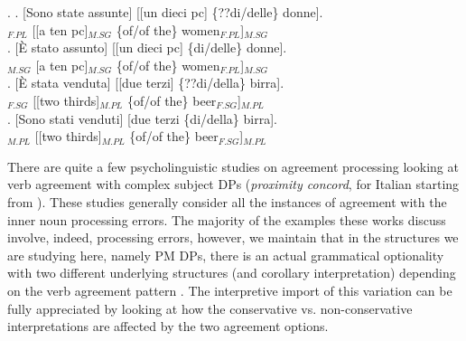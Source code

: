 \documentclass[charis, linguex]{glossa}
\begin{document}
\ex.  \ag. [Sono state assunte] [[un dieci pc] \{??di/delle\} donne]. \\
	       [are been hired]$_{F.PL}$ [[a ten pc]$_{M.SG}$ \{of/{of the}\} women$_{F.PL}$]$_{M.SG}$ \\ \label{relagreesub}
      \bg. [\`{E} stato assunto] [[un dieci pc] \{di/delle\} donne]. \\
 	       [is been hired]$_{M.SG}$ [a ten pc]$_{M.SG}$ \{of/{of the}\} women$_{F.PL}$]$_{M.SG}$ \\ \label{relagreeDP}
	 	\cg. [\`{E} stata venduta] [[due terzi] \{??di/della\} birra]. \\
	      [is been sold]$_{F.SG}$ [[two thirds]$_{M.PL}$ \{of/{of the}\} beer$_{F.SG}$]$_{M.PL}$ \\  \label{fracagreesub}
      \dg.  [Sono stati venduti] [due terzi \{di/della\} birra]. \\
           [are been sold]$_{M.PL}$ [[two thirds]$_{M.PL}$ \{of/{of the}\} beer$_{F.SG}$]$_{M.PL}$ \\ \label{fracagreeDP}

There are quite a few psycholinguistic studies on agreement processing looking at verb agreement with complex subject DPs  (\textit{proximity concord}, for Italian starting from \citealt{vig95}). These studies generally consider all the instances of agreement with the inner noun processing errors. The majority of the examples these works discuss involve, indeed, processing errors, however, we maintain that in the structures we are studying here, namely PM DPs, there is an actual grammatical optionality with two different underlying structures (and corollary interpretation) depending on the verb agreement pattern \citep[\S1]{man19}. The interpretive import of this variation can be fully appreciated by looking at how the conservative vs. non-conservative interpretations are affected by the two agreement options.
\end{document}
